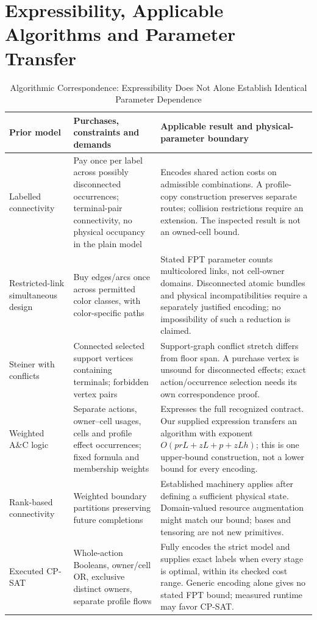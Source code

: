 \section{Expressibility, Applicable Algorithms and Parameter Transfer}
\begin{table}[t]
\caption{Algorithmic Correspondence: Expressibility Does Not Alone Establish Identical Parameter Dependence}\label{tab:algorithmic-position}
\centering\footnotesize
\begin{tabular}{p{}p{}p{}}
\toprule Prior model & Purchases, constraints and demands & Applicable result and physical-parameter boundary \\\midrule
Labelled connectivity~\cite{labels} & Pay once per label across possibly disconnected occurrences; terminal-pair connectivity, no physical occupancy in the plain model & Encodes shared action costs on admissible combinations. A profile-copy construction preserves separate routes; collision restrictions require an extension. The inspected result is not an owned-cell bound.\\
Restricted-link simultaneous design~\cite{simultaneous} & Buy edges/arcs once across permitted color classes, with color-specific paths & Stated FPT parameter counts multicolored links, not cell-owner domains. Disconnected atomic bundles and physical incompatibilities require a separately justified encoding; no impossibility of such a reduction is claimed.\\
Steiner with conflicts~\cite{conflicts} & Connected selected support vertices containing terminals; forbidden vertex pairs & Support-graph conflict stretch differs from floor span. A purchase vertex is unsound for disconnected effects; exact action/occurrence selection needs its own correspondence proof.\\
Weighted A\&C logic~\cite{logic} & Separate actions, owner--cell usages, cells and profile effect occurrences; fixed formula and membership weights & Expresses the full recognized contract. Our supplied expression transfers an algorithm with exponent $O(prL+zL+p+zLh)$; this is one upper-bound construction, not a lower bound for every encoding.\\
Rank-based connectivity~\cite{rank} & Weighted boundary partitions preserving future completions & Established machinery applies after defining a sufficient physical state. Domain-valued resource augmentation might match our bound; bases and tensoring are not new primitives.\\
Executed CP-SAT~\cite{cpsat} & Whole-action Booleans, owner/cell OR, exclusive distinct owners, separate profile flows & Fully encodes the strict model and supplies exact labels when every stage is optimal, within its checked cost range. Generic encoding alone gives no stated FPT bound; measured runtime may favor CP-SAT.\\
\bottomrule\end{tabular}\end{table}
